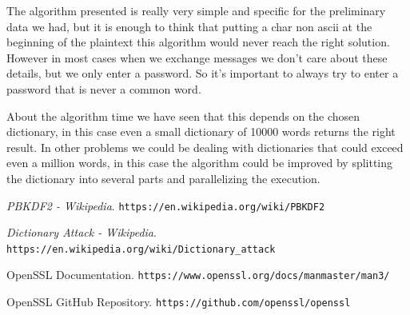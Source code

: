 \documentclass[11pt]{article}
\begin{document}
The algorithm presented is really very simple and specific for the preliminary data we had, but it is enough to think that putting a char non ascii at the beginning of the plaintext this algorithm would never reach the right solution. However in most cases when we exchange messages we don't care about these details, but we only enter a password. So it's important to always try to enter a password that is never a common word.

About the algorithm time we have seen that this depends on the chosen dictionary, in this case even a small dictionary of 10000 words returns the right result. In other problems we could be dealing with dictionaries that could exceed even a million words, in this case the algorithm could be improved by splitting the dictionary into several parts and parallelizing the execution.

\begin{thebibliography}{99}

{\em PBKDF2 - Wikipedia}.
  \verb|https://en.wikipedia.org/wiki/PBKDF2|

{\em Dictionary Attack - Wikipedia}.
  \verb|https://en.wikipedia.org/wiki/Dictionary_attack|

OpenSSL Documentation.
\verb|https://www.openssl.org/docs/manmaster/man3/|

OpenSSL GitHub Repository.
\verb|https://github.com/openssl/openssl|

\end{thebibliography}
\end{document}
